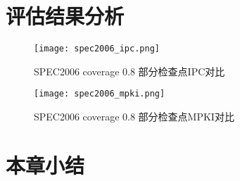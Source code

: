 \section{评估结果分析}

\begin{figure}[htb]
	\centering
	\setlength\tabcolsep{3pt}  %
	\vspace{5pt} %
	\texttt{[image: spec2006\_ipc.png]}
	\caption{SPEC2006 coverage 0.8 部分检查点IPC对比}
	\label{fig:figure1}
\end{figure}

\begin{figure}[htb]
	\centering
	\setlength\tabcolsep{3pt}  %
	\vspace{5pt} %
	\texttt{[image: spec2006\_mpki.png]}
	\caption{SPEC2006 coverage 0.8 部分检查点MPKI对比}
	\label{fig:figure2}
\end{figure}


\section{本章小结}

